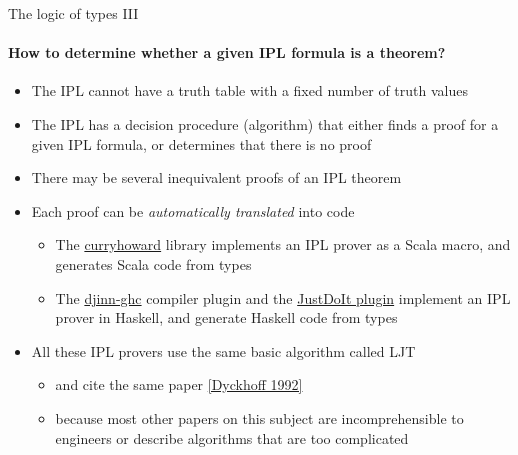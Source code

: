 \documentclass[english]{beamer}
\begin{document}
\begin{frame}{The logic of types III}


\framesubtitle{How to determine whether a given IPL formula is a theorem?}
\begin{itemize}
\item The IPL cannot have a truth table with a fixed number of truth values
\item The IPL has a decision procedure (algorithm) that either finds a proof
for a given IPL formula, or determines that there is no proof
\item There may be several inequivalent proofs of an IPL theorem
\item Each proof can be \emph{automatically translated} into code
\begin{itemize}
\item The \href{https://github.com/Chymyst/curryhoward}{curryhoward} library
implements an IPL prover as a Scala macro, and generates Scala code
from types
\item The \href{https://hackage.haskell.org/package/djinn-ghc}{djinn-ghc}
compiler plugin and the \href{https://github.com/nomeata/ghc-justdoit}{JustDoIt plugin}
implement an IPL prover in Haskell, and generate Haskell code from
types
\end{itemize}
\item All these IPL provers use the same basic algorithm called LJT 
\begin{itemize}
\item and cite the same paper {\footnotesize{}\href{https://rd.host.cs.st-andrews.ac.uk/publications/jsl57.pdf}{[Dyckhoff 1992]}}{\footnotesize \par}
\item because most other papers on this subject are incomprehensible to
engineers or describe algorithms that are too complicated
\end{itemize}
\end{itemize}
\end{frame}
\end{document}
